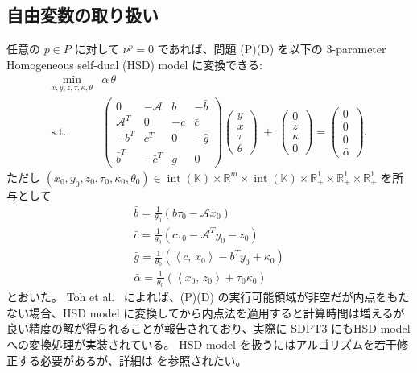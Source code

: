 \documentclass{jsarticle}
\newcommand{\inprod}[2]{\left\langle #1, \, #2 \right\rangle}
\begin{document}
\subsection{自由変数の取り扱い}
任意の $p\in P$ に対して $\nu^p=0$ であれば、問題 (P)(D) を以下の
3-parameter Homogeneous self-dual (HSD) model \cite{Wright1997} に変換できる:
\[
  \begin{array}{cl}
   \min_{x,y,z,\tau,\kappa,\theta} & \bar{\alpha}\,\theta \\[3pt]
   \text{s.t.}
   & \begin{pmatrix}
       0 & -\mathcal{A} & b & -\bar{b}\\
       \mathcal{A}^T & 0 & -c & \bar{c}\\
       -b^T & c^T & 0 & -\bar{g}\\
       \bar{b}^T & -\bar{c}^T & \bar{g} & 0
     \end{pmatrix}
     \begin{pmatrix} y \\ x \\ \tau \\ \theta \end{pmatrix}
   \;+\;
     \begin{pmatrix} 0 \\ z \\ \kappa \\ 0 \end{pmatrix}
   =
     \begin{pmatrix} 0 \\ 0 \\ 0 \\ \bar{\alpha} \end{pmatrix}.
  \end{array}
\]
ただし $(x_0,y_0,z_0,\tau_0,\kappa_0,\theta_0)\in 
  \operatorname{int}(\mathbb{K}) \times \mathbb{R}^m \times \operatorname{int}(\mathbb{K})
  \times \mathbb{R}^1_+ \times \mathbb{R}^1_+ \times \mathbb{R}^1_+$
を所与として
\begin{gather*}
    \bar{b} = \frac{1}{\theta_0}(b\tau_0 - \mathcal{A}x_0) \\
    \bar{c} = \frac{1}{\theta_0}(c\tau_0 - \mathcal{A}^T y_0 - z_0) \\
    \bar{g} = \frac{1}{\theta_0}(\inprod{c}{x_0} - b^Ty_0 + \kappa_0) \\
    \bar{\alpha} = \frac{1}{\theta_0} (\inprod{x_0}{z_0} + \tau_0 \kappa_0)
\end{gather*}
とおいた。
Toh et al.~\cite{toh1999} によれば、(P)(D) の実行可能領域が非空だが内点をもたない場合、HSD model に変換してから内点法を適用すると計算時間は増えるが良い精度の解が得られることが報告されており、実際に SDPT3 にもHSD modelへの変換処理が実装されている。  
HSD model を扱うにはアルゴリズムを若干修正する必要があるが、詳細は \cite{toh1999} を参照されたい。
\end{document}
